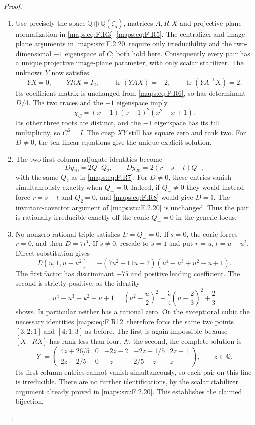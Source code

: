 \documentclass[11pt,a4paper]{article}
\theoremstyle{definition}
\begin{document}
\begin{proof}
\begin{enumerate}[label=\arabic*.]
\item Use precisely the space $\mathbb Q\oplus\mathbb Q(\zeta_5)$,
matrices $A,R,X$ and projective plane normalization in
\eqref{maps:eq:F.R3}--\eqref{maps:eq:F.R5}.  The centralizer and image-plane arguments
in \ref{maps:src:F.2.20} require only irreducibility and the two-dimensional
$-1$ eigenspace of $C$; both hold here.
Consequently every pair has a unique projective image-plane
parameter, with only scalar stabilizer.
The unknown $Y$ now satisfies
\[
 YX=0,\qquad YRX=I_2,\qquad
 \operatorname{tr}(YAX)=-2,\qquad
 \operatorname{tr}(YA^{-1}X)=2.
 \tag{F.R11}\label{maps:eq:F.R11}
\]
Its coefficient matrix is unchanged from \eqref{maps:eq:F.R6}, so has
determinant $D/4$.
The two traces and the $-1$ eigenspace imply
\[
 \chi_C=(x-1)(x+1)^2(x^2+x+1).
\]
Its other three roots are distinct, and the $-1$ eigenspace
has its full multiplicity, so $C^6=I$.
The cusp $XY$ still has square zero and rank two.
For $D\ne0$, the ten linear equations give the unique
explicit solution.

\item The two first-column adjugate identities become
\[
 D y_{10}=2Q_-Q_2,
 \qquad D y_{20}=2(r-s-t)Q_-,
 \tag{F.R12}\label{maps:eq:F.R12}
\]
with the same $Q_2$ as in \eqref{maps:eq:F.R7}.
For $D\ne0$, these entries vanish simultaneously exactly
when $Q_-=0$.
Indeed, if $Q_-\ne0$ they would instead force
$r=s+t$ and $Q_2=0$, and \eqref{maps:eq:F.R8} would give $D=0$.
The invariant-covector argument of \ref{maps:src:F.2.20} is unchanged.
Thus the pair is rationally irreducible exactly off the
conic $Q_-=0$ in the generic locus.

\item No nonzero rational triple satisfies $D=Q_-=0$.
If $s=0$, the conic forces $r=0$, and then $D=7t^3$.
If $s\ne0$, rescale to $s=1$ and put
$r=u$, $t=u-u^2$.  Direct substitution gives
\[
 D(u,1,u-u^2)=
 -(7u^2-11u+7)(u^4-u^3+u^2-u+1).
 \tag{F.R13}\label{maps:eq:F.R13}
\]
The first factor has discriminant $-75$ and positive
leading coefficient.  The second is strictly positive,
as the identity
\[
 u^4-u^3+u^2-u+1
 =\left(u^2-\frac u2\right)^2
  +\frac34\left(u-\frac23\right)^2+\frac23
\]
shows.  In particular neither has a rational zero.
On the exceptional cubic the necessary identities \eqref{maps:eq:F.R12}
therefore force the same two points $[3:2:1]$ and $[4:1:3]$
as before.  The first is again impossible because
$[X\mid RX]$ has rank less than four.
At the second, the complete solution is
\[
 Y_z=\begin{pmatrix}
 4z+26/5&0&-2z-2&-2z-1/5&2z+1\\
 2z-2/5&0&-z&2/5-z&z
 \end{pmatrix},\qquad z\in\mathbb Q.
 \tag{F.R14}\label{maps:eq:F.R14}
\]
Its first-column entries cannot vanish simultaneously,
so each pair on this line is irreducible.
There are no further identifications, by the scalar
stabilizer argument already proved in \ref{maps:src:F.2.20}.
This establishes the claimed bijection.


\end{enumerate}
\end{proof}
\end{document}
